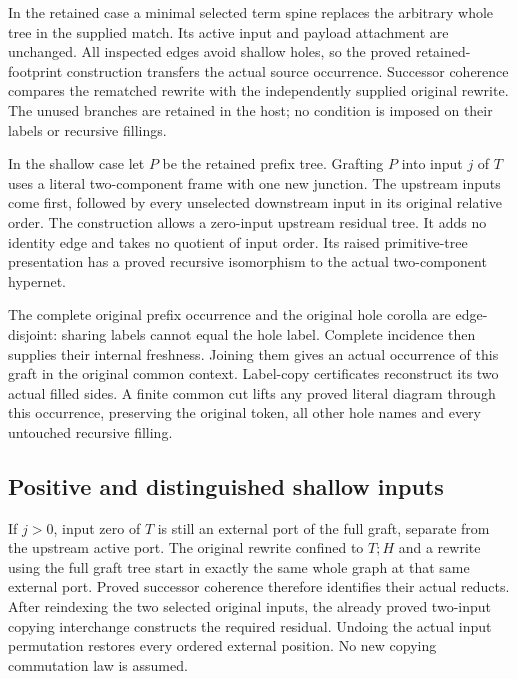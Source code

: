 In the retained case a minimal selected term spine replaces the arbitrary
whole tree in the supplied match. Its active input and payload attachment
are unchanged. All inspected edges avoid shallow holes, so the proved
retained-footprint construction transfers the actual source occurrence.
Successor coherence compares the rematched rewrite with the independently
supplied original rewrite. The unused branches are retained in the host;
no condition is imposed on their labels or recursive fillings.

In the shallow case let $P$ be the retained prefix tree. Grafting $P$ into
input $j$ of $T$ uses a literal two-component frame with one new junction.
The upstream inputs come first, followed by every unselected downstream
input in its original relative order. The construction allows a zero-input
upstream residual tree. It adds no identity edge and takes no quotient of
input order. Its raised primitive-tree presentation has a proved recursive
isomorphism to the actual two-component hypernet.

The complete original prefix occurrence and the original hole corolla are
edge-disjoint: sharing labels cannot equal the hole label. Complete incidence
then supplies their internal freshness. Joining them gives an actual
occurrence of this graft in the original common context. Label-copy
certificates reconstruct its two actual filled sides. A finite common cut
lifts any proved literal diagram through this occurrence, preserving the
original token, all other hole names and every untouched recursive filling.


\par{}
\par{}
\par{}

\subsection{Positive and distinguished shallow inputs}
If $j>0$, input zero of $T$ is still an external port of the full graft,
separate from the upstream active port. The original rewrite confined to
$T;H$ and a rewrite using the full graft tree start in exactly the same whole
graph at that same external port. Proved successor coherence therefore
identifies their actual reducts. After reindexing the two selected original
inputs, the already proved two-input copying interchange constructs the
required residual. Undoing the actual input permutation restores every
ordered external position. No new copying commutation law is assumed.


